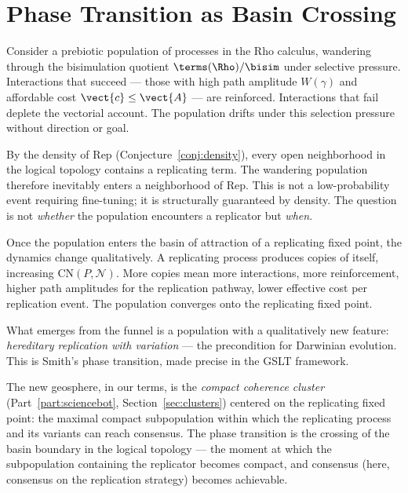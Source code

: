 \section{Phase Transition as Basin Crossing}

\begin{remark}
Consider a prebiotic population of processes in the Rho calculus,
wandering through the bisimulation quotient $\terms(\Rho)/{\bisim}$
under selective pressure.
Interactions that succeed --- those with high path amplitude
$W(\gamma)$ and affordable cost $\vect{c} \leq \vect{A}$ ---
are reinforced.
Interactions that fail deplete the vectorial account.
The population drifts under this selection pressure without
direction or goal.
\end{remark}

\begin{remark}
By the density of $\mathrm{Rep}$ (Conjecture~\ref{conj:density}),
every open neighborhood in the logical topology contains a
replicating term.
The wandering population therefore inevitably enters a neighborhood
of $\mathrm{Rep}$.
This is not a low-probability event requiring fine-tuning; it is
structurally guaranteed by density.
The question is not \emph{whether} the population encounters a
replicator but \emph{when}.
\end{remark}

\begin{remark}
Once the population enters the basin of attraction of a replicating
fixed point, the dynamics change qualitatively.
A replicating process produces copies of itself, increasing
$\mathrm{CN}(P, \mathcal{N})$.
More copies mean more interactions, more reinforcement, higher
path amplitudes for the replication pathway, lower effective cost
per replication event.
The population converges onto the replicating fixed point.

What emerges from the funnel is a population with a qualitatively
new feature: \emph{hereditary replication with variation} ---
the precondition for Darwinian evolution.
This is Smith's phase transition, made precise in the GSLT
framework.

The new geosphere, in our terms, is the \emph{compact coherence
cluster} (Part~\ref{part:sciencebot}, Section~\ref{sec:clusters}) centered on the replicating fixed
point: the maximal compact subpopulation within which the
replicating process and its variants can reach consensus.
The phase transition is the crossing of the basin boundary in
the logical topology --- the moment at which the subpopulation
containing the replicator becomes compact, and consensus (here,
consensus on the replication strategy) becomes achievable.
\end{remark}

